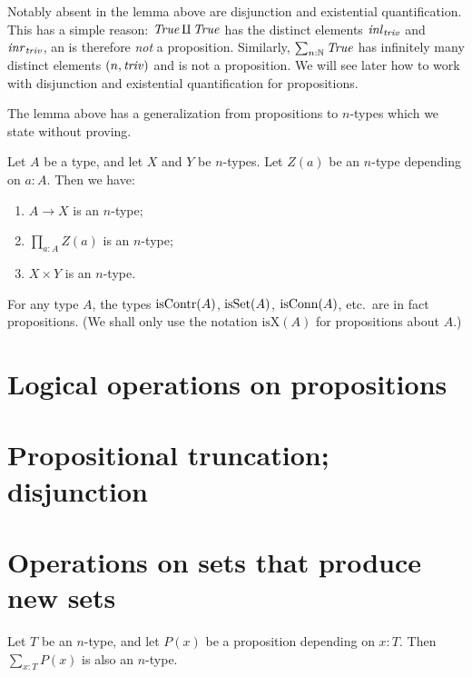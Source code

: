 Notably absent in the lemma above are disjunction
and existential quantification. This has a simple reason:
$\mathop{\mathit{True}}\amalg \mathop{\mathit{True}}$ has the distinct elements
$\mathop{{\it inl}_{\mathop{\mathit{triv}}}}$ and $\mathop{{\it inr}_{\mathop{\mathit{triv}}}}$, an is therefore \emph{not} a proposition.
Similarly, $\sum_{n:\mathbb{N}} \mathop{\mathit{True}}$ has infinitely many
distinct elements $(n,\mathop{\mathit{triv}})$ and is not a proposition. We will see later how
to work with disjunction and existential quantification for propositions.

The lemma above has a generalization from propositions to
$n$-types which we state without proving.

\begin{lemma}\label{lem:level_n_utils}
Let $A$ be a type, and let $X$ and $Y$ be $n$-types.
Let $Z(a)$ be an $n$-type depending on $a:A$. Then we have:
\begin{enumerate}
\item\label{level_n_utils_implication} $A\to X$ is an $n$-type;
\item\label{level_n_utils_pi} $\prod_{a:A} Z(a)$ is an $n$-type;
\item\label{level_n_utils_times} $X\times Y$ is an $n$-type.
\end{enumerate}
\end{lemma}

\begin{lemma}\label{lem:props-are-props}
  For any type $A$, the types $\mathrm{isContr}(A)$, $\mathrm{isSet}(A)$, $\mathrm{isConn}(A)$, etc.\ are in fact propositions.
  (We shall only use the notation $\mathrm{isX}(A)$ for propositions about $A$.)
\end{lemma}
\section{Logical operations on propositions}
\label{sec:logical-operations}

\section{Propositional truncation; disjunction}
\label{sec:propositional-truncation}

\section{Operations on sets that produce new sets}
\label{sec:operations-on-sets}

\begin{lemma}\label{lem:subtype}
Let $T$ be an $n$-type, and let $P(x)$ be a proposition depending on $x:T$. 
Then $\sum_{x:T} P(x)$ is also an $n$-type.
\end{lemma}

